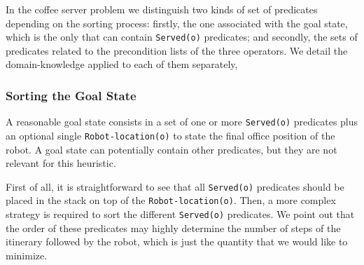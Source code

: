 \documentclass[12pt,a4paper,oneside]{article}
\numberwithin{equation}{section}
\numberwithin{equation}{section}
\theoremstyle{definition}
\begin{document}
In the coffee server problem we distinguish two kinds of set of predicates depending on the sorting process: firstly, the one associated with the goal state, which is the only that can contain \texttt{Served(o)} predicates; and secondly, the sets of predicates related to the precondition lists of the three operators. We detail the domain-knowledge applied to each of them separately, 

\subsubsection{Sorting the Goal State}

A reasonable goal state consists in a set of one or more \texttt{Served(o)} predicates plus an optional single \texttt{Robot-location(o)} to state the final office position of the robot. A goal state can potentially contain other predicates, but they are not relevant for this heuristic.


First of all, it is straightforward to see that all \texttt{Served(o)} predicates should be placed in the stack on top of the \texttt{Robot-location(o)}. Then, a more complex strategy is required to sort the different \texttt{Served(o)} predicates. We point out that the order of these predicates may highly determine the number of steps of the itinerary followed by the robot, which is just the quantity that we would like to minimize. 
\end{document}
